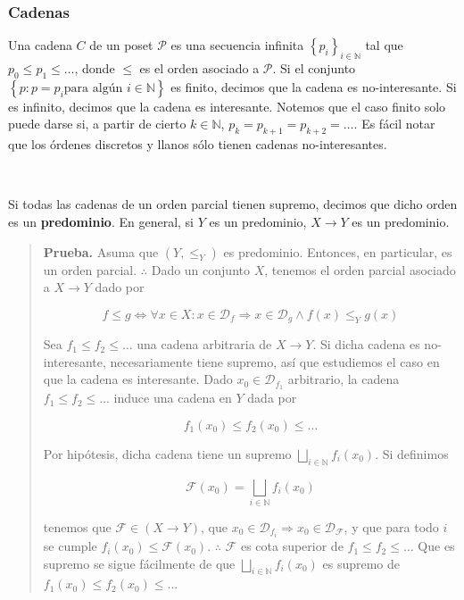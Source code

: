 \documentclass[a4paper, 12pt]{article}
\begin{document}
\subsubsection{Cadenas}

Una cadena $C$ de un poset $\mathcal{P}$ es una secuencia infinita $\left\{ p_i
\right\}_{i \in \mathbb{N}} $ tal que $p_0 \leq p_1 \leq \ldots$, donde $\leq$
es el orden asociado a $\mathcal{P}$. Si el conjunto $\left\{ p : p = p_i \text{
para algún } i \in \mathbb{N} \right\} $ es finito, decimos que la cadena es
no-interesante. Si es infinito, decimos que la cadena es interesante. Notemos
que el caso finito solo puede darse si, a partir de cierto $k \in \mathbb{N}$,
$p_k = p_{k+1} = p_{k+2} = \ldots$. Es fácil notar que los órdenes discretos y
llanos sólo tienen cadenas no-interesantes.

~

Si todas las cadenas de un orden parcial tienen supremo, decimos que dicho orden
es un \textbf{predominio}. En general, si $Y$ es un predominio, $X \to Y$ es un
predominio.



\small
\begin{quote}

\textbf{Prueba.} Asuma que $\left( Y, \leq_Y \right) $ es predominio. Entonces,
en particular, es un orden parcial. $\therefore $ Dado un conjunto $X$, tenemos
el orden parcial asociado a $X \to Y$ dado por 

\begin{equation*}
  f \leq g \iff \forall x \in X : x \in \mathcal{D}_f \Rightarrow x \in \mathcal{D}_g \land f(x)
  \leq_Y g(x)
\end{equation*}

Sea $f_1 \leq f_2 \leq \ldots$ una cadena arbitraria de $X \to Y$. Si dicha
cadena es no-interesante, necesariamente tiene supremo, así que estudiemos el
caso en que la cadena es interesante. Dado $x_0 \in \mathcal{D}_{f_1}$ arbitrario, la cadena
$f_1 \leq f_2 \leq \ldots$ induce una cadena en $Y$ dada por 

\begin{equation*}
  f_1(x_0) \leq f_2(x_0) \leq \ldots
\end{equation*}

Por hipótesis, dicha cadena tiene un supremo $\bigsqcup_{i \in \mathbb{N}}
f_i(x_0)$. Si definimos 

$$\mathcal{F}(x_0) = \bigsqcup_{i \in \mathbb{N}} f_i(x_0)$$

tenemos que $\mathcal{F} \in (X \to Y)$, que $x_0 \in \mathcal{D}_{f_i}
\Rightarrow x_0\in \mathcal{D}_{\mathcal{F}}$, y que para todo $i$ se cumple
$f_i(x_0) \leq \mathcal{F}(x_0)$. $\therefore $ $\mathcal{F}$ es cota superior
de $f_1 \leq f_2 \leq \ldots$ Que es supremo se sigue fácilmente de que 
$\bigsqcup_{i \in \mathbb{N}} f_i(x_0)$ es supremo de $f_1(x_0) \leq f_2(x_0)
\leq \ldots$


\end{quote}
\normalsize
\end{document}
